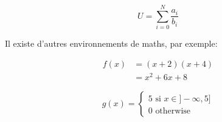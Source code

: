 \documentclass[10pt,a4paper]{article}
\begin{document}
\begin{equation}
	U = \sum_{i=0}^N \dfrac{a_i}{b_i}
	\label{eq:awesome_equation}
\end{equation}

Il existe d'autres environnements de maths, par exemple:

\begin{align}
	f(x) & = (x+2)(x+4)   \\
	     & = x^2 + 6x + 8 
\end{align}

\begin{equation}
	g(x) = \left\lbrace 
	\begin{split}
		5 \mbox{ si } x \in ]-\infty, 5] \\
		0 \mbox{ otherwise }	
	\end{split}	
	\right.
\end{equation}
\end{document}
